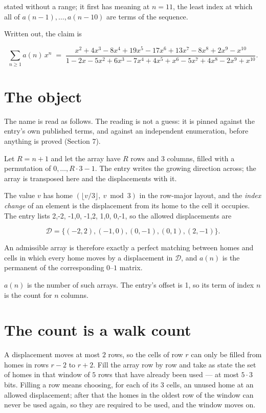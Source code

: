 \documentclass[11pt]{article}
\theoremstyle{definition}
\begin{document}
stated without a range; it first has meaning at $n = 11$, the least index at which all of $a(n-1),\dots,a(n-10)$ are terms of the sequence.

Written out, the claim is

\[\sum_{n \ge 1} a(n)\,x^n \;=\; \frac{x^{2} + 4x^{3} - 8x^{4} + 19x^{5} - 17x^{6} + 13x^{7} - 8x^{8} + 2x^{9} - x^{10}}{1 - 2x - 5x^{2} + 6x^{3} - 7x^{4} + 4x^{5} + x^{6} - 5x^{7} + 4x^{8} - 2x^{9} + x^{10}}.\]

\section{The object}

The name is read as follows. The reading is not a guess: it is pinned against the entry's own published terms, and against an independent enumeration, before anything is proved (Section 7).

Let $R = n + 1$ and let the array have $R$ rows and $3$ columns, filled with a permutation of $0,\dots,R\cdot3-1$. The entry writes the growing direction across; the array is transposed here and the displacements with it.

The value $v$ has home $(\lfloor v/3\rfloor,\ v \bmod 3)$ in the row-major layout, and the {\itshape index change} of an element is the displacement from its home to the cell it occupies. The entry lists 2,-2, -1,0, -1,2, 1,0, 0,-1, so the allowed displacements are

\[\mathcal{D} = \{(-2,2), (-1,0), (0,-1), (0,1), (2,-1)\}.\]

An admissible array is therefore exactly a perfect matching between homes and cells in which every home moves by a displacement in $\mathcal{D}$, and $a(n)$ is the permanent of the corresponding $0$--$1$ matrix.

$a(n)$ is the number of such arrays. The entry's offset is 1, so its term of index $n$ is the count for $n$ columns.

\section{The count is a walk count}

A displacement moves at most $2$ rows, so the cells of row $r$ can only be filled from homes in rows $r-2$ to $r+2$. Fill the array row by row and take as state the set of homes in that window of $5$ rows that have already been used --- at most $5\cdot3$ bits. Filling a row means choosing, for each of its $3$ cells, an unused home at an allowed displacement; after that the homes in the oldest row of the window can never be used again, so they are required to be used, and the window moves on.
\end{document}
